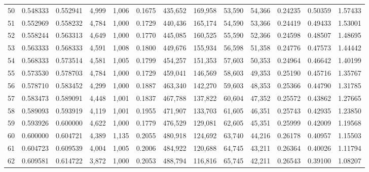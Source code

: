 \begin{tabular}{rrrrrrrrrrrrr}
50  &  0.548333 &  0.552941 &   4,999 &  1,006 &                                     0.1675 &  435,652 &  169,958 &   53,590 &   54,366 &  0.24235 &  0.50359 &  1.57433 \\
51  &  0.552969 &  0.558232 &   4,784 &  1,000 &                                     0.1729 &  440,436 &  165,174 &   54,590 &   53,366 &  0.24419 &  0.49433 &  1.53001 \\
52  &  0.558244 &  0.563313 &   4,649 &  1,000 &                                     0.1770 &  445,085 &  160,525 &   55,590 &   52,366 &  0.24598 &  0.48507 &  1.48695 \\
53  &  0.563333 &  0.568333 &   4,591 &  1,008 &                                     0.1800 &  449,676 &  155,934 &   56,598 &   51,358 &  0.24776 &  0.47573 &  1.44442 \\
54  &  0.568333 &  0.573514 &   4,581 &  1,005 &                                     0.1799 &  454,257 &  151,353 &   57,603 &   50,353 &  0.24964 &  0.46642 &  1.40199 \\
55  &  0.573530 &  0.578703 &   4,784 &  1,000 &                                     0.1729 &  459,041 &  146,569 &   58,603 &   49,353 &  0.25190 &  0.45716 &  1.35767 \\
56  &  0.578710 &  0.583452 &   4,299 &  1,000 &                                     0.1887 &  463,340 &  142,270 &   59,603 &   48,353 &  0.25366 &  0.44790 &  1.31785 \\
57  &  0.583473 &  0.589091 &   4,448 &  1,001 &                                     0.1837 &  467,788 &  137,822 &   60,604 &   47,352 &  0.25572 &  0.43862 &  1.27665 \\
58  &  0.589093 &  0.593919 &   4,119 &  1,001 &                                     0.1955 &  471,907 &  133,703 &   61,605 &   46,351 &  0.25743 &  0.42935 &  1.23850 \\
59  &  0.593926 &  0.600000 &   4,622 &  1,000 &                                     0.1779 &  476,529 &  129,081 &   62,605 &   45,351 &  0.25999 &  0.42009 &  1.19568 \\
60  &  0.600000 &  0.604721 &   4,389 &  1,135 &                                     0.2055 &  480,918 &  124,692 &   63,740 &   44,216 &  0.26178 &  0.40957 &  1.15503 \\
61  &  0.604723 &  0.609539 &   4,004 &  1,005 &                                     0.2006 &  484,922 &  120,688 &   64,745 &   43,211 &  0.26364 &  0.40026 &  1.11794 \\
62  &  0.609581 &  0.614722 &   3,872 &  1,000 &                                     0.2053 &  488,794 &  116,816 &   65,745 &   42,211 &  0.26543 &  0.39100 &  1.08207 \\

\end{tabular}
